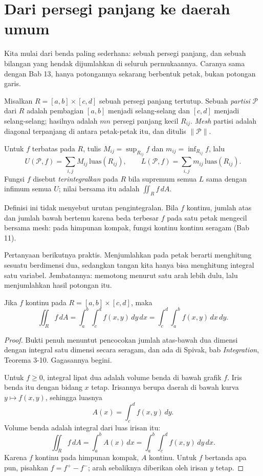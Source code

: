 \section{Dari persegi panjang ke daerah umum}

Kita mulai dari benda paling sederhana: sebuah persegi panjang, dan sebuah
bilangan yang hendak dijumlahkan di seluruh permukaannya. Caranya sama dengan
Bab 13, hanya potongannya sekarang berbentuk petak, bukan potongan garis.

\begin{definisi}
Misalkan $R=[a,b]\times[c,d]$ sebuah persegi panjang tertutup. Sebuah
\emph{partisi} $\mathcal{P}$ dari $R$ adalah pembagian $[a,b]$ menjadi
selang-selang dan $[c,d]$ menjadi selang-selang; hasilnya adalah $mn$ persegi
panjang kecil $R_{ij}$. \emph{Mesh} partisi adalah diagonal terpanjang di
antara petak-petak itu, dan ditulis $\|\mathcal{P}\|$.

Untuk $f$ terbatas pada $R$, tulis $M_{ij}=\sup_{R_{ij}}f$ dan
$m_{ij}=\inf_{R_{ij}}f$, lalu
\[
U(\mathcal{P},f)=\sum_{i,j}M_{ij}\,\mathrm{luas}(R_{ij}),
\qquad
L(\mathcal{P},f)=\sum_{i,j}m_{ij}\,\mathrm{luas}(R_{ij}).
\]
Fungsi $f$ disebut \emph{terintegralkan} pada $R$ bila supremum semua $L$ sama
dengan infimum semua $U$; nilai bersama itu adalah $\iint_{R}f\,dA$.
\end{definisi}

Definisi ini tidak menyebut urutan pengintegralan. Bila $f$ kontinu, jumlah
atas dan jumlah bawah bertemu karena beda terbesar $f$ pada satu petak
mengecil bersama mesh: pada himpunan kompak, fungsi kontinu kontinu seragam
(Bab 11).

Pertanyaan berikutnya praktis. Menjumlahkan pada petak berarti menghitung
sesuatu berdimensi dua, sedangkan tangan kita hanya bisa menghitung integral satu
variabel. Jembatannya: memotong menurut satu arah lebih dulu, lalu menjumlahkan
hasil potongan itu.

\begin{teorema}[Fubini]
Jika $f$ kontinu pada $R=[a,b]\times[c,d]$, maka
\[
\iint_{R} f\,dA=\int_{a}^{b}\!\!\int_{c}^{d} f(x,y)\,dy\,dx
=\int_{c}^{d}\!\!\int_{a}^{b} f(x,y)\,dx\,dy .
\]
\end{teorema}

\begin{proof}
Bukti penuh menuntut pencocokan jumlah atas-bawah dua dimensi dengan integral
satu dimensi secara seragam, dan ada di Spivak, bab \emph{Integration},
Teorema 3-10. Gagasannya begini.

Untuk $f\ge 0$, integral lipat dua adalah volume benda di bawah grafik $f$.
Iris benda itu dengan bidang $x$ tetap. Irisannya berupa daerah di bawah kurva
$y\mapsto f(x,y)$, sehingga luasnya
\[
A(x)=\int_{c}^{d}f(x,y)\,dy .
\]
Volume benda adalah integral dari luas irisan itu:
\[
\iint_{R}f\,dA=\int_{a}^{b}A(x)\,dx=\int_{a}^{b}\!\!\int_{c}^{d}f(x,y)\,dy\,dx .
\]
Karena $f$ kontinu pada himpunan kompak, $A$ kontinu. Untuk $f$ bertanda apa
pun, pisahkan $f=f^{+}-f^{-}$; arah sebaliknya diberikan oleh irisan $y$
tetap.
\end{proof}


